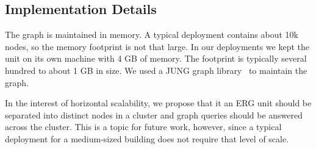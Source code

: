 

\subsection{Implementation Details}
The graph is maintained in memory.  A typical deployment contains about 10k nodes, so the memory footprint is not that large. 
In our deployments we kept the unit on its own machine with 4 GB of memory.  The footprint is typically several hundred to
about 1 GB in size.  We used a JUNG graph library~\cite{jung} to maintain the graph.

In the interest of horizontal scalability, we propose that it an ERG unit should be separated into distinct nodes in
a cluster and graph queries should be answered across the cluster.  This is a topic for future work, however, since a typical
deployment for a medium-sized building does not require that level of scale.
















